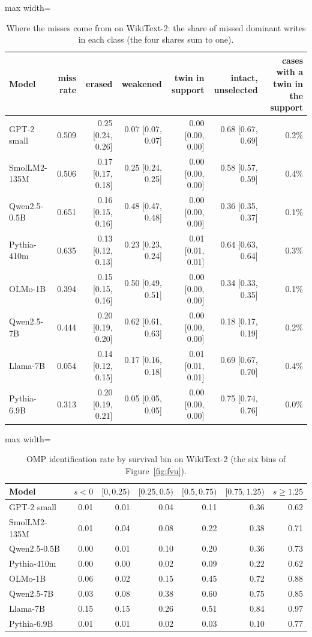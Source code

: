\begin{table}[H]\centering\scriptsize
\caption{Where the misses come from on WikiText-2: the share of missed dominant writes in each class (the four shares sum to one).}\label{app:z3-miss-wikitext}
\begin{adjustbox}{max width=\linewidth}
\begin{tabular}{lrrrrrr}\toprule
Model & miss rate & erased & weakened & twin in support & intact, unselected & cases with a twin in the support \\ \midrule
GPT-2 small & 0.509 & 0.25 [0.24, 0.26] & 0.07 [0.07, 0.07] & 0.00 [0.00, 0.00] & 0.68 [0.67, 0.69] & 0.2\% \\
SmolLM2-135M & 0.506 & 0.17 [0.17, 0.18] & 0.25 [0.24, 0.25] & 0.00 [0.00, 0.00] & 0.58 [0.57, 0.59] & 0.4\% \\
Qwen2.5-0.5B & 0.651 & 0.16 [0.15, 0.16] & 0.48 [0.47, 0.48] & 0.00 [0.00, 0.00] & 0.36 [0.35, 0.37] & 0.1\% \\
Pythia-410m & 0.635 & 0.13 [0.12, 0.13] & 0.23 [0.23, 0.24] & 0.01 [0.01, 0.01] & 0.64 [0.63, 0.64] & 0.3\% \\
OLMo-1B & 0.394 & 0.15 [0.15, 0.16] & 0.50 [0.49, 0.51] & 0.00 [0.00, 0.00] & 0.34 [0.33, 0.35] & 0.1\% \\
Qwen2.5-7B & 0.444 & 0.20 [0.19, 0.20] & 0.62 [0.61, 0.63] & 0.00 [0.00, 0.00] & 0.18 [0.17, 0.19] & 0.2\% \\
Llama-7B & 0.054 & 0.14 [0.12, 0.15] & 0.17 [0.16, 0.18] & 0.01 [0.01, 0.01] & 0.69 [0.67, 0.70] & 0.4\% \\
Pythia-6.9B & 0.313 & 0.20 [0.19, 0.21] & 0.05 [0.05, 0.05] & 0.00 [0.00, 0.00] & 0.75 [0.74, 0.76] & 0.0\% \\
\bottomrule\end{tabular}\end{adjustbox}
\end{table}
\begin{table}[H]\centering\scriptsize
\caption{OMP identification rate by survival bin on WikiText-2 (the six bins of Figure~\ref{fig:fvu}).}\label{app:z3-bins-wikitext}
\begin{adjustbox}{max width=\linewidth}
\begin{tabular}{lrrrrrr}\toprule
Model & $s<0$ & $[0,0.25)$ & $[0.25,0.5)$ & $[0.5,0.75)$ & $[0.75,1.25)$ & $s\ge1.25$ \\ \midrule
GPT-2 small & 0.01 & 0.01 & 0.04 & 0.11 & 0.36 & 0.62 \\
SmolLM2-135M & 0.01 & 0.04 & 0.08 & 0.22 & 0.38 & 0.71 \\
Qwen2.5-0.5B & 0.00 & 0.01 & 0.10 & 0.20 & 0.36 & 0.73 \\
Pythia-410m & 0.00 & 0.00 & 0.02 & 0.09 & 0.22 & 0.62 \\
OLMo-1B & 0.06 & 0.02 & 0.15 & 0.45 & 0.72 & 0.88 \\
Qwen2.5-7B & 0.03 & 0.08 & 0.38 & 0.60 & 0.75 & 0.85 \\
Llama-7B & 0.15 & 0.15 & 0.26 & 0.51 & 0.84 & 0.97 \\
Pythia-6.9B & 0.01 & 0.01 & 0.02 & 0.03 & 0.10 & 0.77 \\
\bottomrule\end{tabular}\end{adjustbox}
\end{table}
